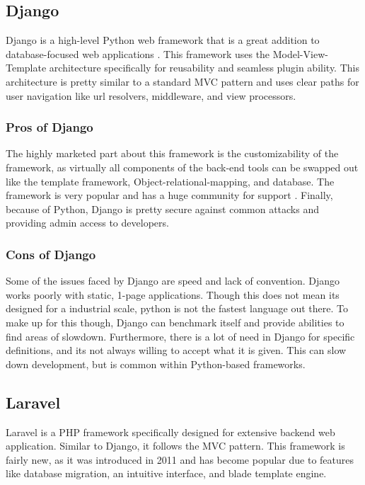 \documentclass[onecolumn, draftclsnofoot,10pt, compsoc]{IEEEtran}
\begin{document}
\subsection{Django}
Django is a high-level Python web framework that is a great addition to database-focused web applications \cite{tripathi_2018}. This framework uses the Model-View-Template architecture specifically for reusability and seamless plugin ability. This architecture is pretty similar to a standard MVC pattern and uses clear paths for user navigation like url resolvers, middleware, and view processors. 

\subsubsection{Pros of Django}
The highly marketed part about this framework is the customizability of the framework, as virtually all components of the back-end tools can be swapped out like the template framework, Object-relational-mapping, and database. The framework is very popular and has a huge community for support \cite{malhotra_2018}. Finally, because of Python, Django is pretty secure against common attacks and providing admin access to developers. 

\subsubsection{Cons of Django}
Some of the issues faced by Django are speed and lack of convention. Django works poorly with static, 1-page applications. Though this does not mean it\textquotesingle s designed for a industrial scale, python is not the fastest language out there. To make up for this though, Django can benchmark itself and provide abilities to find areas of slowdown. Furthermore, there is a lot of need in Django for specific definitions, and its not always willing to accept what it is given. This can slow down development, but is common within Python-based frameworks. \cite{poczwardowski_2018}

\subsection{Laravel}
Laravel is a PHP framework specifically designed for extensive backend web application. Similar to Django, it follows the MVC pattern. This framework is fairly new, as it was introduced in 2011 and has become popular due to features like database migration, an intuitive interface, and blade template engine. 
\end{document}
